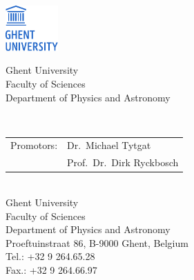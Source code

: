 \documentclass[10pt,a4paper,twoside,dutch,english,openright,leqno]{book}
\begin{document}

\clearpage{\pagestyle{empty}\cleardoublepage}
\thispagestyle{empty}

\normalsize

\noindent
\begin{minipage}{3cm}%
   \href{https://www.ugent.be/}{\includegraphics*[width=2cm]{UGent.pdf}}
 \end{minipage}\hfill
 \begin{minipage}{8cm}
 \raggedleft
 \textsf{Ghent University\\
 Faculty of Sciences\\
 Department of Physics and Astronomy}
 \end{minipage}
\\[2cm]

\vfill
\noindent \begin{tabular}{ @{} l l}
Promotors: & Dr.\ Michael Tytgat\\
 & Prof.\ Dr.\ Dirk Ryckbosch\\
\end{tabular}
\\[2cm]

\noindent Ghent University \\
\noindent Faculty of Sciences\\
[0.3cm]
\noindent Department of Physics and Astronomy \\
\noindent Proeftuinstraat 86, B-9000 Ghent, Belgium\\
[0.3cm]
\noindent Tel.: +32 9 264.65.28\\
\noindent Fax.: +32 9 264.66.97

\vfill
\end{document}
